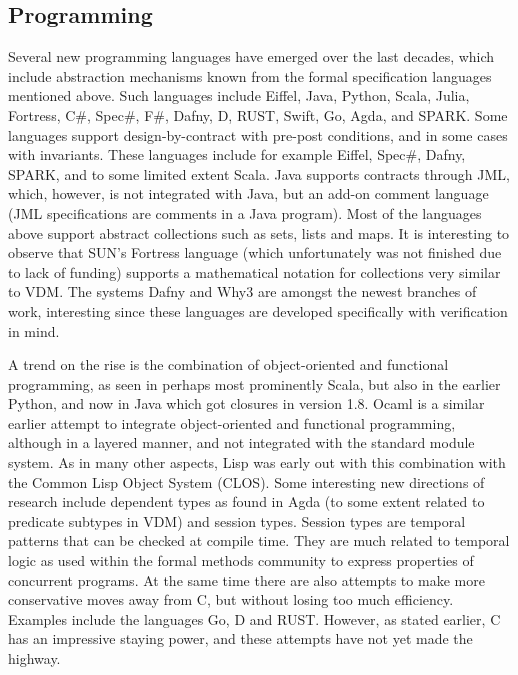 \subsection{Programming}

Several new programming languages have emerged over the last 
decades, which include abstraction mechanisms known from the formal 
specification languages mentioned above. Such languages include 
Eiffel, Java, Python, Scala, Julia, Fortress,  C\#, Spec\#, F\#,  Dafny, D, 
RUST, Swift, Go, Agda, and SPARK.  Some languages support 
design-by-contract with pre-post conditions, and in some cases with 
invariants. These languages  include for example Eiffel, Spec\#, 
Dafny, SPARK, and to some limited extent Scala. Java supports 
contracts through JML, which, however, is not integrated with Java, 
but an add-on comment language (JML specifications are comments in 
a Java program). Most of the languages above support abstract 
collections such as sets, lists and maps. It is interesting to 
observe that SUN’s Fortress language (which unfortunately was not 
finished due to lack of funding) supports a mathematical 
notation for collections very similar to VDM. The systems 
Dafny and Why3 are amongst the newest branches of work, 
interesting since these languages are developed 
specifically with verification in mind.

A trend on the rise is the combination of object-oriented 
and functional programming, as seen in perhaps most prominently 
Scala, but also in the earlier Python, and now in Java which got 
closures in version 1.8.  Ocaml is a similar earlier attempt to 
integrate object-oriented and functional programming, although in a 
layered manner, and not integrated with the standard module system. 
As in many other aspects, Lisp was early out
with this combination with the Common Lisp Object System (CLOS).
Some interesting new directions of research include dependent types 
as found in Agda (to some extent related to predicate subtypes in 
VDM) and session types. Session types are temporal patterns that 
can be checked at compile time. They are much related to temporal 
logic as used within the formal methods community to express 
properties of concurrent programs. At the same time there are also 
attempts to make more conservative moves away from C, but without 
losing too much efficiency. Examples include the languages Go, D and RUST. However, as stated earlier, C has an impressive staying power, and these attempts have not yet made the highway.

